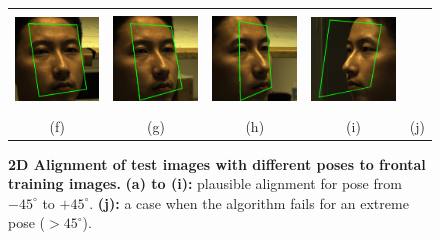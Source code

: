 \documentclass[12pt,journal,draftcls,letterpaper,onecolumn]{IEEEtran}
\providecommand{\DIFdelbegin}{} %
\providecommand{\DIFdelend}{} %
\providecommand{\DIFaddbeginFL}{} %
\providecommand{\DIFaddendFL}{} %
\providecommand{\DIFdelbeginFL}{} %
\providecommand{\DIFdelendFL}{} %
\begin{document}
\begin{figure}
{\begin{tabular}{ccccc}
\includegraphics[height=1in]{figures_cvpr/17} &
\includegraphics[height=1in]{figures_cvpr/19} &
\includegraphics[height=1in]{figures_cvpr/21} &
\includegraphics[height=1in]{figures_cvpr/3} \DIFdelbeginFL %
\DIFdelendFL \vspace{-.1in} \DIFaddbeginFL \\ 
\DIFaddendFL (f) & (g) & (h) & (i) & (j) \DIFaddbeginFL \vspace{-.1in}
\DIFaddendFL \end{tabular}
\DIFaddbeginFL }
\DIFaddendFL \caption{{\bf 2D Alignment of test images with different poses to frontal training images.} {\bf (a) to (i):}  plausible alignment for pose from $-45^{\circ}$
to $+45^{\circ}$. {\bf (j):} a case when the algorithm fails for an extreme pose ($>45^{\circ}$).
}\label{fig:pose-alignment} \DIFdelbeginFL %
\DIFdelendFL \DIFaddbeginFL \vspace{-.2in}
\DIFaddendFL \end{figure}
\DIFdelbegin %
\DIFdelend 
\end{document}
